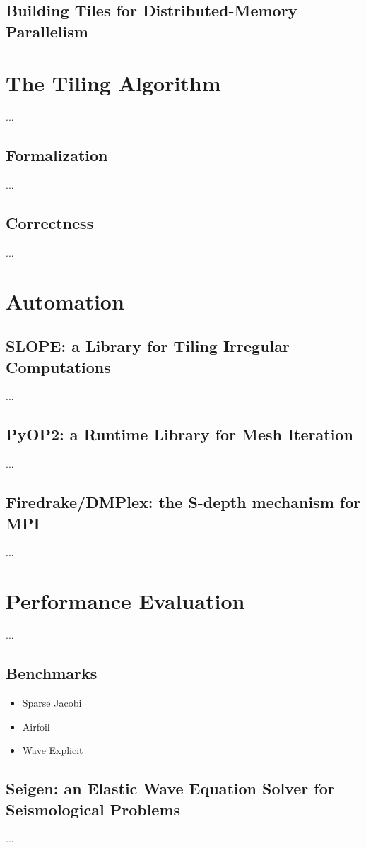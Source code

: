 \subsection*{Building Tiles for Distributed-Memory Parallelism}


\section{The Tiling Algorithm}
...

\subsection{Formalization}
...

\subsection{Correctness}
...


\section{Automation}
\label{sec:tiling:automation}

\subsection{SLOPE: a Library for Tiling Irregular Computations}
...

\subsection{PyOP2: a Runtime Library for Mesh Iteration}
...

\subsection{Firedrake/DMPlex: the S-depth mechanism for MPI}
...


\section{Performance Evaluation}
...

\subsection{Benchmarks}
\begin{itemize}
\item Sparse Jacobi
\item Airfoil
\item Wave Explicit
\end{itemize}

\subsection{Seigen: an Elastic Wave Equation Solver for Seismological Problems}
\label{sec:tiling:seigen}
...
